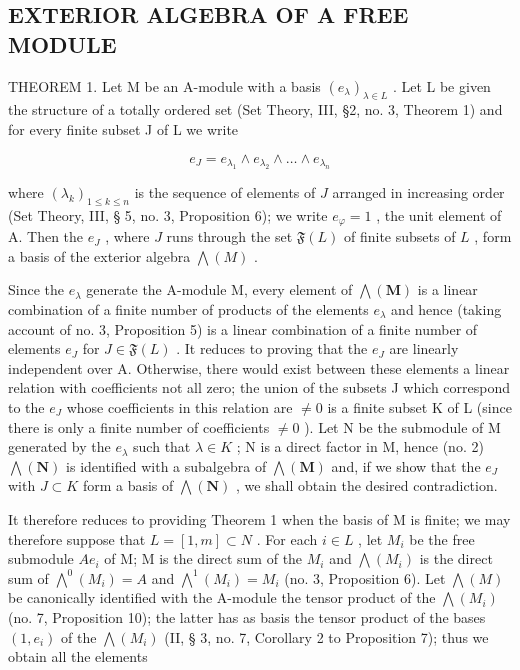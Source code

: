 \subsection{EXTERIOR ALGEBRA OF A FREE MODULE}

THEOREM 1. Let M be an A-module with a basis \((e_{\lambda})_{\lambda \in L}\) . Let L be given the structure of a totally ordered set (Set Theory, III, §2, no. 3, Theorem 1) and for every finite subset J of L we write

\[
e _ {J} = e _ {\lambda_ {1}} \wedge e _ {\lambda_ {2}} \wedge \dots \wedge e _ {\lambda_ {n}}\tag{18}
\]

where \((\lambda_k)_{1 \leqslant k \leqslant n}\) is the sequence of elements of \(J\) arranged in increasing order (Set Theory, III, § 5, no. 3, Proposition 6); we write \(e_\varphi = 1\) , the unit element of A. Then the \(e_J\) , where \(J\) runs through the set \(\mathfrak{F}(L)\) of finite subsets of \(L\) , form a basis of the exterior algebra \(\bigwedge(M)\) .

Since the \(e_{\lambda}\) generate the A-module M, every element of \(\bigwedge(\mathbf{M})\) is a linear combination of a finite number of products of the elements \(e_{\lambda}\) and hence (taking account of no. 3, Proposition 5) is a linear combination of a finite number of elements \(e_{J}\) for \(J \in \mathfrak{F}(L)\) . It reduces to proving that the \(e_{J}\) are linearly independent over A. Otherwise, there would exist between these elements a linear relation with coefficients not all zero; the union of the subsets J which correspond to the \(e_{J}\) whose coefficients in this relation are \(\neq 0\) is a finite subset K of L (since there is only a finite number of coefficients \(\neq 0\) ). Let N be the submodule of M generated by the \(e_{\lambda}\) such that \(\lambda \in K\) ; N is a direct factor in M, hence (no. 2) \(\bigwedge(\mathbf{N})\) is identified with a subalgebra of \(\bigwedge(\mathbf{M})\) and, if we show that the \(e_{J}\) with \(J \subset K\) form a basis of \(\bigwedge(\mathbf{N})\) , we shall obtain the desired contradiction.

It therefore reduces to providing Theorem 1 when the basis of M is finite; we may therefore suppose that \(L = [1, m] \subset N\) . For each \(i \in L\) , let \(M_i\) be the free submodule \(Ae_i\) of M; M is the direct sum of the \(M_i\) and \(\bigwedge(M_i)\) is the direct sum of \(\bigwedge^0(M_i) = A\) and \(\bigwedge^1(M_i) = M_i\) (no. 3, Proposition 6). Let \(\bigwedge(M)\) be canonically identified with the A-module the tensor product of the \(\bigwedge(M_i)\) (no. 7, Proposition 10); the latter has as basis the tensor product of the bases \((1, e_i)\) of the \(\bigwedge(M_i)\) (II, § 3, no. 7, Corollary 2 to Proposition 7); thus we obtain all the elements

